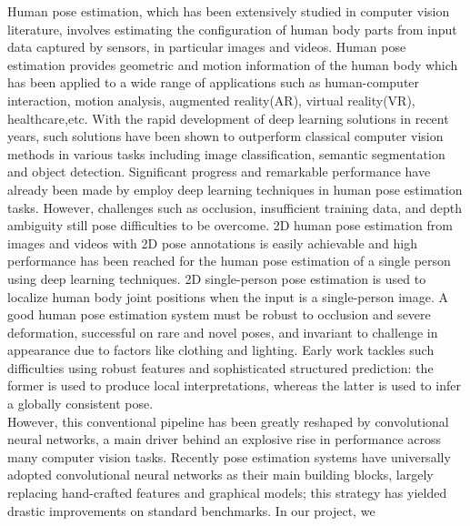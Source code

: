 \documentclass[final]{cvpr}
\begin{document}
Human pose estimation, which has been extensively studied in computer vision literature, involves estimating the configuration of human body parts from input data captured by sensors, in particular images and videos. Human pose estimation provides geometric and motion information of the human body which has been applied to a wide range of applications such as human-computer interaction, motion analysis, augmented reality(AR), virtual reality(VR), healthcare,etc. With the rapid development of deep learning solutions in recent years, such solutions have been shown to outperform classical computer vision methods in various tasks including image classification, semantic segmentation and object detection. Significant progress and remarkable performance have already been made by employ deep learning techniques in human pose estimation tasks. However, challenges such as occlusion, insufficient training data, and depth ambiguity still pose difficulties to be overcome. 2D human pose estimation from images and videos with 2D pose annotations is easily achievable and high performance has been reached for the human pose estimation of a single person using deep learning techniques. 2D single-person pose estimation is used to localize human body joint positions when the input is a single-person image. A good human pose estimation system must be robust to occlusion and severe deformation, successful on rare and novel poses, and invariant to challenge in appearance due to factors like clothing and lighting. Early work tackles such difficulties using robust features and sophisticated structured prediction: the former is used to produce local interpretations, whereas the latter is used to infer a globally consistent pose.\\
\indent However, this conventional pipeline has been greatly reshaped by convolutional neural networks\cite{lecun1998gradient}, a main driver behind an explosive rise in performance across many computer vision tasks. Recently pose estimation\cite{tompson2014joint} systems have universally adopted convolutional neural networks as their main building blocks, largely replacing hand-crafted features and graphical models; this strategy has yielded drastic improvements on standard benchmarks. In our project, we 
\end{document}
